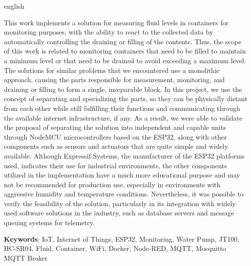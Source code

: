 \newpage
\thispagestyle{empty}
\begin{resumo}[Abstract]
\begin{otherlanguage*}{english}
\begin{SingleSpace}
This work implements a solution for measuring fluid levels in containers for monitoring purposes, with the ability to react to the collected data by automatically controlling the draining or filling of the contents. Thus, the scope of this work is related to monitoring containers that need to be filled to maintain a minimum level or that need to be drained to avoid exceeding a maximum level. The solutions for similar problems that we encountered use a monolithic approach, causing the parts responsible for measurement, monitoring, and draining or filling to form a single, inseparable block. In this project, we use the concept of separating and specializing the parts, so they can be physically distant from each other while still fulfilling their functions and communicating through the available internet infrastructure, if any. As a result, we were able to validate the proposal of separating the solution into independent and capable units through NodeMCU microcontrollers based on the ESP32, along with other components such as sensors and actuators that are quite simple and widely available. Although Expressif Systems, the manufacturer of the ESP32 platforms used, indicates their use for industrial environments, the other components utilized in the implementation have a much more educational purpose and may not be recommended for production use, especially in environments with aggressive humidity and temperature conditions. Nevertheless, it was possible to verify the feasibility of the solution, particularly in its integration with widely used software solutions in the industry, such as database servers and message queuing systems for telemetry.
\end{SingleSpace}

\vspace{\onelineskip}
   \textbf{Keywords}: IoT, Internet of Things, ESP32, Monitoring, Water Pump, JT100, HC-SR04, Fluid, Container, WiFi, Docker, Node-RED, MQTT, Mosquitto MQTT Broker
 \end{otherlanguage*}
\end{resumo}